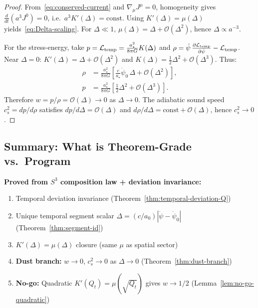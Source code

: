 \begin{proof}
From~\eqref{eq:conserved-current} and $\nabla_\mu J^\mu=0$, homogeneity gives $\frac{d}{dt}(a^3 J^0)=0$,
i.e.\ $a^3 K'(\Delta)=\text{const}$. Using $K'(\Delta)=\mu(\Delta)$ yields~\eqref{eq:Delta-scaling}.
For $\Delta\ll 1$, $\mu(\Delta)=\Delta+\mathcal{O}(\Delta^2)$, hence $\Delta\propto a^{-3}$.

For the stress-energy, take $p = \mathcal{L}_{\rm temp}=\frac{a_\star^2}{8\pi G}K(\Delta)$
and $\rho = \dot\psi\,\frac{\partial \mathcal{L}_{\rm temp}}{\partial \dot\psi}-\mathcal{L}_{\rm temp}$.
Near $\Delta = 0$: $K'(\Delta)=\Delta+\mathcal{O}(\Delta^2)$ and $K(\Delta)=\frac{1}{2}\Delta^2+\mathcal{O}(\Delta^3)$.
Thus:
\begin{align*}
\rho &= \frac{a_\star^2}{8\pi G}\left[\frac{c}{a_\star}\dot\psi_0\,\Delta+\mathcal{O}(\Delta^2)\right], \\
p &= \frac{a_\star^2}{8\pi G}\left[\frac{1}{2}\Delta^2+\mathcal{O}(\Delta^3)\right].
\end{align*}
Therefore $w=p/\rho=\mathcal{O}(\Delta)\to 0$ as $\Delta\to 0$.
The adiabatic sound speed $c_s^2=dp/d\rho$ satisfies $dp/d\Delta = \mathcal{O}(\Delta)$ and $d\rho/d\Delta = \text{const}+\mathcal{O}(\Delta)$, hence $c_s^2\to 0$.
\end{proof}

\subsection{Summary: What is Theorem-Grade vs.\ Program}

\begin{tcolorbox}[colback=blue!5!white, colframe=blue!60!black, title={Theorem-Grade Results}]
\textbf{Proved from $S^3$ composition law + deviation invariance:}
\begin{enumerate}[nosep]
\item Temporal deviation invariance (Theorem~\ref{thm:temporal-deviation-Q})
\item Unique temporal segment scalar $\Delta = (c/a_0)|\dot\psi - \dot\psi_0|$ (Theorem~\ref{thm:segment-id})
\item $K'(\Delta) = \mu(\Delta)$ closure (same $\mu$ as spatial sector)
\item \textbf{Dust branch:} $w \to 0$, $c_s^2 \to 0$ as $\Delta \to 0$ (Theorem~\ref{thm:dust-branch})
\item \textbf{No-go:} Quadratic $K'(Q_t) = \mu(\sqrt{Q_t})$ gives $w \to 1/2$ (Lemma~\ref{lem:no-go-quadratic})
\end{enumerate}
\end{tcolorbox}

